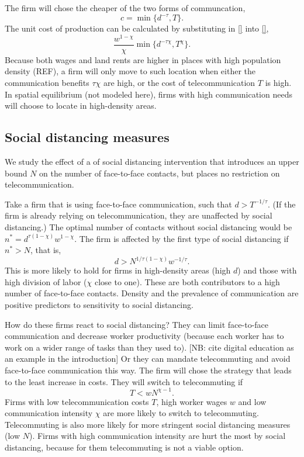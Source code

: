 \documentclass[10pt,letterpaper]{article}
\begin{document}
The firm will chose the cheaper of the two forms of communcation,
\begin{equation}
	c = \min \{d^{-\tau}, T\}.
\end{equation}
The unit cost of production can be calculated by substituting in \eqref{} into \eqref{},
\begin{equation}
\frac {w^{1-\chi}}{\chi}
\min \{
	d^{-\tau\chi},T^\chi
\}.
\end{equation}
Because both wages and land rents are higher in places with high population density (REF), a firm will only move to such location when either the communication benefits $\tau\chi$ are high, or the cost of telecommunication $T$ is high. In spatial equilibrium (not modeled here), firms with high communication needs will choose to locate in high-density areas.

\subsection{Social distancing measures}
We study the effect of a of social distancing intervention that introduces an upper bound $N$ on the number of face-to-face contacts, but places no restriction on telecommunication.

Take a firm that is using face-to-face communication, such that $d>T^{-1/\tau}$. (If the firm is already relying on telecommunication, they are unaffected by social distancing.) The optimal number of contacts without social distancing would be $n^* = d^{\tau(1-\chi)}w^{1-\chi}$. The firm is affected by the first type of social distancing if $n^*>N$, that is, 
\begin{equation}
	d > N^{1/\tau(1-\chi)} w^{-1/\tau}.
\end{equation}
This is more likely to hold for firms in high-density areas (high $d$) and those with high division of labor ($\chi$ close to one). These are both contributors to a high number of face-to-face contacts. Density and the prevalence of communication are positive predictors to sensitivity to social distancing.

How do these firms react to social distancing? They can limit face-to-face communication and decrease worker productivity (because each worker has to work on a wider range of tasks than they used to). [NB: cite digital education as an example in the introduction] Or they can mandate telecommuting and avoid face-to-face communication this way. The firm will chose the strategy that leads to the least increase in costs. They will switch to telecommuting if
\begin{equation}
	T < w N^{\chi-1}.
\end{equation}
Firms with low telecommunication costs $T$, high worker wages $w$ and low communication intensity $\chi$ are more likely to switch to telecommuting. Telecommuting is also more likely for more stringent social distancing measures (low $N$). Firms with high communication intensity are hurt the most by social distancing, because for them telecommuting is not a viable option.
\end{document}
